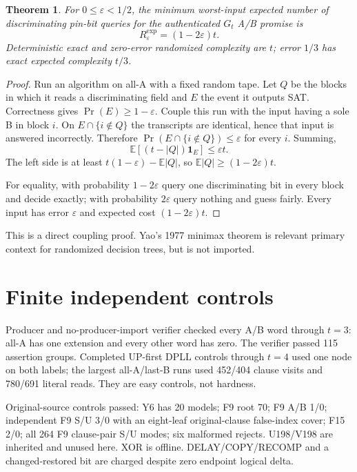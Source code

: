 \documentclass[11pt]{article}
\newtheorem{theorem}{Theorem}
\begin{document}
\begin{theorem}
For $0\le\varepsilon<1/2$, the minimum worst-input expected number of
discriminating pin-bit queries for the authenticated $G_t$ A/B promise is
\[
R^{\mathrm{exp}}_\varepsilon=(1-2\varepsilon)t.
\]
Deterministic exact and zero-error randomized complexity are $t$; error
$1/3$ has exact expected complexity $t/3$.
\end{theorem}
\begin{proof}
Run an algorithm on all-A with a fixed random tape. Let $Q$ be the blocks in
which it reads a discriminating field and $E$ the event it outputs SAT.
Correctness gives $\Pr(E)\ge1-\varepsilon$. Couple this run with the input
having a sole B in block $i$. On $E\cap\{i\notin Q\}$ the transcripts are
identical, hence that input is answered incorrectly. Therefore
$\Pr(E\cap\{i\notin Q\})\le\varepsilon$ for every $i$. Summing,
\[
\mathbb E[(t-|Q|)\mathbf1_E]\le\varepsilon t.
\]
The left side is at least
$t(1-\varepsilon)-\mathbb E|Q|$, so
$\mathbb E|Q|\ge(1-2\varepsilon)t$.

For equality, with probability $1-2\varepsilon$ query one discriminating bit
in every block and decide exactly; with probability $2\varepsilon$ query
nothing and guess fairly. Every input has error $\varepsilon$ and expected
cost $(1-2\varepsilon)t$.
\end{proof}

This is a direct coupling proof. Yao's 1977 minimax theorem is relevant
primary context for randomized decision trees, but is not imported.

\section{Finite independent controls}
Producer and no-producer-import verifier checked every A/B word through
$t=3$: all-A has one extension and every other word has zero. The verifier
passed 115 assertion groups. Completed UP-first DPLL controls through $t=4$
used one node on both labels; the largest all-A/last-B runs used 452/404
clause visits and 780/691 literal reads. They are easy controls, not hardness.

Original-source controls passed: Y6 has 20 models; F9 root 70; F9 A/B 1/0;
independent F9 S/U 3/0 with an eight-leaf original-clause false-index cover;
F15 2/0; all 264 F9 clause-pair S/U modes; six malformed rejects. U198/V198
are inherited and unused here. XOR is offline. DELAY/COPY/RECOMP and a
changed-restored bit are charged despite zero endpoint logical delta.
\end{document}
